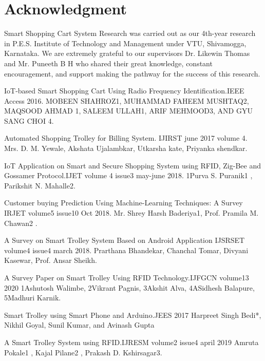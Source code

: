 \documentclass[conference]{IEEEtran}
\begin{document}
\section*{Acknowledgment}

Smart Shopping Cart System Research was carried out as our 4th-year research in P.E.S. Institute of Technology and Management under VTU, Shivamogga, Karnataka. We are extremely grateful to our supervisors Dr. Likewin Thomas and Mr. Puneeth B H who shared their great knowledge, constant encouragement, and support making the pathway for the success of this research. 


\begin{thebibliography}{00}
 IoT-based Smart Shopping Cart Using Radio Frequency Identification.IEEE Access 2016. 
MOBEEN SHAHROZ1, MUHAMMAD FAHEEM MUSHTAQ2, MAQSOOD AHMAD 1, SALEEM ULLAH1, ARIF MEHMOOD3, AND GYU SANG CHOI 4.

 Automated Shopping Trolley for Billing System. IJIRST june 2017 volume 4. 
Mrs. D. M. Yewale, Akshata Ujalambkar, Utkarsha kate, Priyanka shendkar.

 IoT Application on Smart and Secure Shopping System using RFID, Zig-Bee and Gossamer Protocol.IJET volume 4 issue3 may-june 2018. 
1Purva S. Puranik1 , Parikshit N. Mahalle2.

 Customer buying Prediction Using Machine-Learning 
Techniques: A Survey IRJET volume5 issue10 Oct 2018.
Mr. Shrey Harsh Baderiya1, Prof. Pramila M. Chawan2 .

 A Survey on Smart Trolley System Based on Android Application IJSRSET volume4 issue4 march 2018.  
Prarthana Bhandekar, Chanchal Tomar, Divyani Kasewar, Prof. Ansar Sheikh.

 A Survey Paper on Smart Trolley Using RFID Technology.IJFGCN volume13 2020 
1Ashutosh Walimbe, 2Vikrant Pagnis, 3Akshit Alva, 4ASidhesh Balapure, 
5Madhuri Karnik.

 Smart Trolley using Smart Phone and Arduino.JEES 2017
Harpreet Singh Bedi*, Nikhil Goyal, Sunil Kumar, and Avinash Gupta

A Smart Trolley System using RFID.IJRESM volume2 issue4 april 2019 
Amruta Pokale1 , Kajal Pilane2 , Prakash D. Kshirsagar3.


\end{thebibliography}
\end{document}
